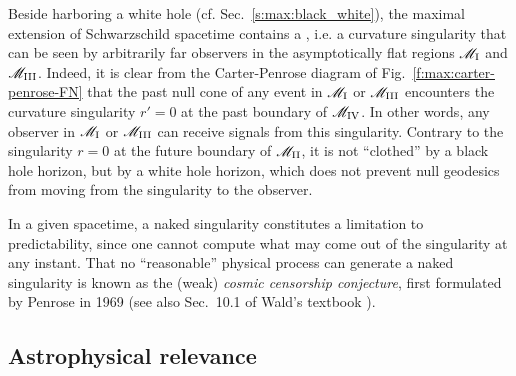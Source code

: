 Beside harboring a white hole (cf. Sec.~\ref{s:max:black_white}),
the maximal extension of Schwarzschild spacetime
contains a
,
i.e. a curvature singularity that can be seen by arbitrarily far observers
in the asymptotically flat regions $\mathscr{M}_{\rm I}$ and $\mathscr{M}_{\rm III}$.
Indeed, it is clear from
the Carter-Penrose diagram of Fig.~\ref{f:max:carter-penrose-FN} that the
past null cone of any event in $\mathscr{M}_{\rm I}$ or $\mathscr{M}_{\rm III}$ encounters the
curvature singularity $r'=0$ at the past boundary of $\mathscr{M}_{\rm IV}$. In other words,
any observer in $\mathscr{M}_{\rm I}$ or $\mathscr{M}_{\rm III}$ can receive signals from
this singularity. Contrary to the singularity $r=0$ at the future boundary of $\mathscr{M}_{\rm II}$,
it is not ``clothed'' by a black hole horizon, but by a white hole horizon, which does not prevent
null geodesics from moving from the singularity to the observer.

In a given spacetime, a naked singularity constitutes a limitation to predictability, since one cannot compute what may come out of the singularity at any instant.
That no ``reasonable'' physical process
can generate a naked singularity is known as the (weak) \emph{cosmic censorship conjecture}, first
formulated by Penrose in 1969 \cite{Penro69} (see also Sec.~10.1 of Wald's textbook \cite{Wald84}).


\subsection{Astrophysical relevance}

